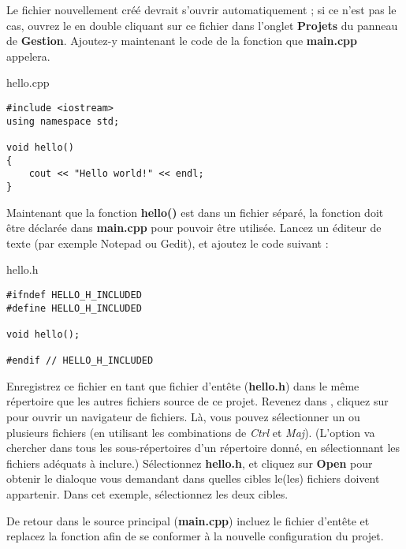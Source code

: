 Le fichier nouvellement créé devrait s'ouvrir automatiquement ; si ce n'est pas le cas, ouvrez le en double cliquant sur ce fichier dans l'onglet \textbf{Projets} du panneau de \textbf{Gestion}. Ajoutez-y maintenant le code de la fonction que \textbf{main.cpp} appelera.

hello.cpp
\begin{lstlisting}
#include <iostream>
using namespace std;
  
void hello()
{
    cout << "Hello world!" << endl;
} 
\end{lstlisting}


Maintenant que la fonction \textbf{hello()} est dans un fichier séparé, la fonction doit être déclarée dans \textbf{main.cpp} pour pouvoir être utilisée. Lancez un éditeur de texte (par exemple Notepad ou Gedit), et ajoutez le code suivant :

hello.h 
\begin{lstlisting}
#ifndef HELLO_H_INCLUDED
#define HELLO_H_INCLUDED
     
void hello();
     
#endif // HELLO_H_INCLUDED
\end{lstlisting}

Enregistrez ce fichier en tant que fichier d'entête (\textbf{hello.h}) dans le même répertoire que les autres fichiers source de ce projet. Revenez dans \codeblocks, cliquez sur  pour ouvrir un navigateur de fichiers. Là, vous pouvez sélectionner un ou plusieurs fichiers (en utilisant les combinations de \textit{Ctrl} et \textit{Maj}). (L'option  va chercher dans tous les sous-répertoires d'un répertoire donné, en sélectionnant les fichiers adéquats à inclure.) Sélectionnez \textbf{hello.h}, et cliquez sur \textbf{Open} pour obtenir le dialoque vous demandant dans quelles cibles le(les) fichiers doivent appartenir. Dans cet exemple, sélectionnez les deux cibles. 



De retour dans le source principal (\textbf{main.cpp}) incluez le fichier d'entête et replacez la fonction  afin de se conformer à la nouvelle configuration du projet.

